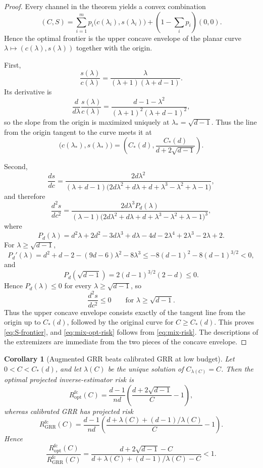 \documentclass[11pt]{amsart}
\numberwithin{equation}{section}
\newtheorem{corollary}[theorem]{Corollary}
\theoremstyle{definition}
\begin{document}
\begin{proof}
Every channel in the theorem yields a convex combination
\[
(C,S)=\sum_{i=1}^m p_i\bigl(c(\lambda_i),s(\lambda_i)\bigr)+(1-\sum_i p_i)(0,0).
\]
Hence the optimal frontier is the upper concave envelope of the planar curve
\(\lambda\mapsto (c(\lambda),s(\lambda))\) together with the origin.

First,
\[
\frac{s(\lambda)}{c(\lambda)}
=
\frac{\lambda}{(\lambda+1)(\lambda+d-1)}. \tag{10.8}\label{eq:ratio-sc}
\]
Its derivative is
\[
\frac{d}{d\lambda}\frac{s(\lambda)}{c(\lambda)}
=
\frac{d-1-\lambda^2}{(\lambda+1)^2(\lambda+d-1)^2}, \tag{10.9}\label{eq:ratio-derivative}
\]
so the slope from the origin is maximized uniquely at
\(
\lambda_\ast=\sqrt{d-1}
\).
Thus the line from the origin tangent to the curve meets it at
\[
\bigl(c(\lambda_\ast),s(\lambda_\ast)\bigr)
=
\left(
C_\ast(d),\frac{C_\ast(d)}{d+2\sqrt{d-1}}
\right).
\]

Second,
\[
\frac{ds}{dc}
=
\frac{2d\lambda^2}{(\lambda+d-1)\bigl(2d\lambda^2+d\lambda+d+\lambda^3-\lambda^2+\lambda-1\bigr)}, \tag{10.10}\label{eq:dsdc}
\]
and therefore
\[
\frac{d^2s}{dc^2}
=
\frac{2d\lambda^3 P_d(\lambda)}
{(\lambda-1)\bigl(2d\lambda^2+d\lambda+d+\lambda^3-\lambda^2+\lambda-1\bigr)^3}, \tag{10.11}\label{eq:d2sdc2}
\]
where
\[
P_d(\lambda)
=
d^2\lambda+2d^2-3d\lambda^3+d\lambda-4d-2\lambda^4+2\lambda^3-2\lambda+2.
\]
For \(\lambda\ge \sqrt{d-1}\),
\[
P_d'(\lambda)
=
d^2+d-2-(9d-6)\lambda^2-8\lambda^3
\le
-8(d-1)^2-8(d-1)^{3/2}<0, \tag{10.12}\label{eq:P-decreasing}
\]
and
\[
P_d(\sqrt{d-1})=2(d-1)^{3/2}(2-d)\le 0. \tag{10.13}\label{eq:P-at-star}
\]
Hence \(P_d(\lambda)\le 0\) for every \(\lambda\ge \sqrt{d-1}\), so
\[
\frac{d^2s}{dc^2}\le 0
\qquad\text{for } \lambda\ge \sqrt{d-1}. \tag{10.14}\label{eq:curve-concave}
\]
Thus the upper concave envelope consists exactly of the tangent line from the origin up to
\(C_\ast(d)\), followed by the original curve for \(C\ge C_\ast(d)\).
This proves \eqref{eq:S-frontier}, and \eqref{eq:mix-opt-risk} follows from \eqref{eq:mix-risk}.
The descriptions of the extremizers are immediate from the two pieces of the concave envelope.
\end{proof}

\begin{corollary}[Augmented GRR beats calibrated GRR at low budget]\label{cor:aug-better}
Let \(0<C<C_\ast(d)\), and let \(\lambda(C)\) be the unique solution of \(C_{\lambda(C)}=C\).
Then the optimal projected inverse-estimator risk is
\[
R^{\mathrm{fc}}_{\mathrm{opt}}(C)
=
\frac{d-1}{nd}\left(\frac{d+2\sqrt{d-1}}{C}-1\right), \tag{10.15}\label{eq:aug-risk-low}
\]
whereas calibrated GRR has projected risk
\[
R^{\mathrm{fc}}_{\mathrm{GRR}}(C)
=
\frac{d-1}{nd}\left(\frac{d+\lambda(C)+(d-1)/\lambda(C)}{C}-1\right). \tag{10.16}\label{eq:grr-risk-cal}
\]
Hence
\[
\frac{R^{\mathrm{fc}}_{\mathrm{opt}}(C)}{R^{\mathrm{fc}}_{\mathrm{GRR}}(C)}
=
\frac{d+2\sqrt{d-1}-C}{d+\lambda(C)+(d-1)/\lambda(C)-C}
<1. \tag{10.17}\label{eq:improvement-factor}
\]
\end{corollary}
\end{document}
